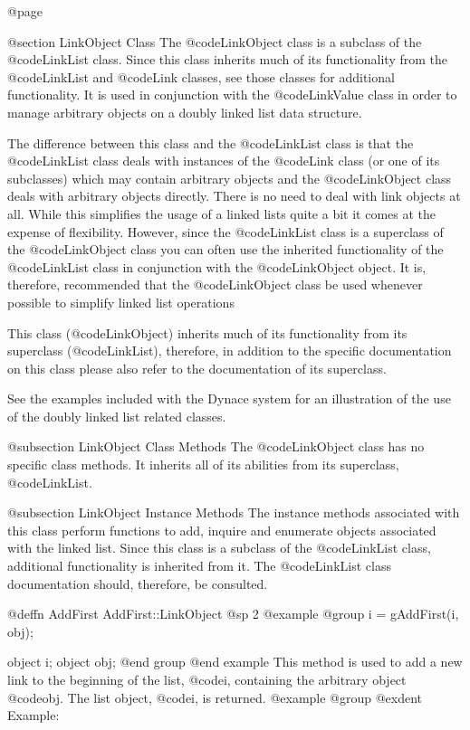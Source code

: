 @page

@section LinkObject Class
The @code{LinkObject} class is a subclass of the @code{LinkList} class.
Since this class inherits much of its functionality from the
@code{LinkList} and @code{Link} classes, see those classes for
additional functionality.  It is used in conjunction with the
@code{LinkValue} class in order to manage arbitrary objects on a doubly
linked list data structure.

The difference between this class and the @code{LinkList} class is that
the @code{LinkList} class deals with instances of the @code{Link} class
(or one of its subclasses) which may contain arbitrary objects and the
@code{LinkObject} class deals with arbitrary objects directly.  There is
no need to deal with link objects at all.  While this simplifies the
usage of a linked lists quite a bit it comes at the expense of
flexibility.  However, since the @code{LinkList} class is a superclass
of the @code{LinkObject} class you can often use the inherited
functionality of the @code{LinkList} class in conjunction with the
@code{LinkObject} object.  It is, therefore, recommended that the
@code{LinkObject} class be used whenever possible to simplify linked
list operations

This class (@code{LinkObject}) inherits much of its functionality from its
superclass (@code{LinkList}), therefore, in addition to the specific
documentation on this class please also refer to the documentation of
its superclass.

See the examples included with the Dynace system for an illustration of the
use of the doubly linked list related classes.



@subsection LinkObject Class Methods
The @code{LinkObject} class has no specific class methods.  It inherits
all of its abilities from its superclass, @code{LinkList}.


@subsection LinkObject Instance Methods
The instance methods associated with this class perform functions to
add, inquire and enumerate objects associated with the linked list.
Since this class is a subclass of the @code{LinkList} class, additional
functionality is inherited from it.  The @code{LinkList} class
documentation should, therefore, be consulted.






@deffn {AddFirst} AddFirst::LinkObject
@sp 2
@example
@group
i = gAddFirst(i, obj);

object  i;
object  obj;
@end group
@end example
This method is used to add a new link to the beginning of the list,
@code{i}, containing the arbitrary object @code{obj}.  The list object,
@code{i}, is returned.
@example
@group
@exdent Example:

